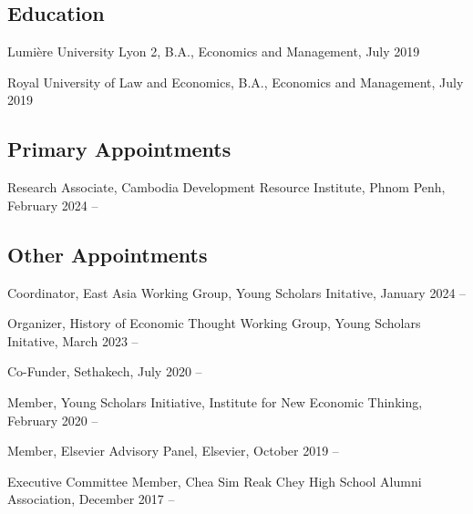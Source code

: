 \documentclass[10pt,a4paper]{article}
\begin{document}
\subsection*{Education}
	
	Lumière University Lyon 2, B.A., Economics and Management, July 2019
	
	Royal University of Law and Economics, B.A., Economics and Management, July 2019 
	

\subsection*{Primary Appointments}	


		Research Associate, Cambodia Development Resource Institute, Phnom Penh,  February 2024 --

\subsection*{Other Appointments}
	
	Coordinator, East Asia Working Group, Young Scholars Initative, January 2024 --
	
	Organizer, History of Economic Thought Working Group, Young Scholars Initative, March 2023 --
	
	Co-Funder, Sethakech, July 2020 --
	
	Member, Young Scholars Initiative, Institute for New Economic Thinking, February 2020 --

	Member, Elsevier Advisory Panel, Elsevier, October 2019 --
	
	Executive Committee Member, Chea Sim Reak Chey High School Alumni Association, December 2017 --

	
\end{document}
